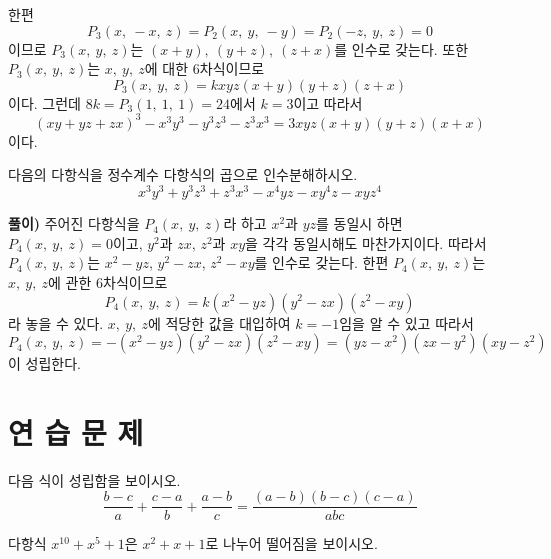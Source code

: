 \documentclass[a4paper]{article}
\begin{document}
한편 
\[
P_{3}(x,\:-x,\:z) = P_{2}(x,\:y,\:-y) = P_{2}(-z,\:y,\:z)=0
\]
이므로 $P_{3}(x,\:y,\:z)$는 $(x+y), \:(y+z),\:(z+x)$를 인수로 갖는다. 또한 $P_{3}(x,\:y,\:z)$는 $x, \:y,\:z$에 대한 $6$차식이므로 
\[
P_{3}(x,\:y,\:z) = k x y z (x+y)(y+z)(z+x)
\]
이다. 그런데 $8k = P_{3}(1,\:1,\:1) =24$에서 $k=3$이고 따라서
\[
(xy+yz+zx)^3 - x^3y^3-y^3z^3-z^3x^3 =3xyz(x+y)(y+z)(x+x)
\]
이다.

\vspace{1em}
\begin{problem}
  다음의 다항식을 정수계수 다항식의 곱으로 인수분해하시오.
  \[
  x^3y^3+y^3z^3+z^3x^3 - x^4yz-xy^4z-xyz^4
  \]
\end{problem}

\textbf{풀이)} 주어진 다항식을 $P_{4}(x,\:y,\:z)$라 하고 $x^2$과 $yz$를 동일시 하면 $P_{4}(x,\:y,\:z)=0$이고,
$y^2$과 $zx$, $z^2$과 $xy$을 각각 동일시해도 마찬가지이다. 따라서 $P_{4}(x,\:y,\:z)$는 $x^2-yz$, $y^2-zx$, $z^2-xy$를 인수로 갖는다. 한편 $P_{4}(x,\:y,\:z)$는 $x, \:y,\:z$에 관한 $6$차식이므로
\[
P_{4}(x,\:y,\:z) = k (x^2-yz)(y^2-zx)(z^2-xy)
\]
라 놓을 수 있다. $x, \:y,\:z$에 적당한 값을 대입하여 $k=-1$임을 알 수 있고 따라서
\[
P_{4}(x,\:y,\:z) = - (x^2-yz)(y^2-zx)(z^2-xy) =(yz-x^2)(zx-y^2)(xy-z^2)
\]
이 성립한다.

\vspace{3em}

\section{ 연 습 문 제 }

\begin{problem}
다음 식이 성립함을 보이시오.
\[
\frac{b-c}{a} + \frac{c-a}{b} +\frac{a-b}{c} = \frac{(a-b)(b-c)(c-a)}{abc}
\]
\end{problem} 
\vspace{2em}
\begin{problem}
다항식 $x^{10}+x^5+1$은 $x^2+x+1$로 나누어 떨어짐을 보이시오.
\end{problem}
\end{document}
